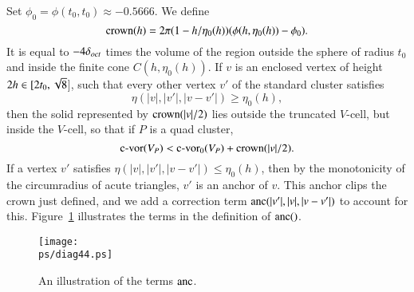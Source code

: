 Set $\phi_0=\phi(t_0,t_0)\approx -0.5666$. We define
    \begin{equation}\operatorname{crown}(h) =
2\pi(1-h/\eta_0(h))(\phi(h,\eta_0(h))-\phi_0). \end{equation} It
is equal to $-4\delta_{oct}$ times the volume of the region outside the
sphere of radius $t_0$ and inside the finite cone
$C(h,\eta_0(h))$.  If $v$ is an enclosed vertex of height
$2h\in[2t_0,\sqrt8$],
 such that every other vertex $v'$ of the
standard cluster satisfies
$$\eta(|v|,|v'|,|v-v'|)\ge \eta_0(h),$$ then the
solid represented by $\operatorname{crown}(|v|/2)$ lies outside the truncated
$V$-cell, but inside the $V$-cell, so that if $P$ is a quad
cluster,
 $${\operatorname{c-vor}}(V_P) < {\operatorname{c-vor}}_0(V_P) + \operatorname{crown}(|v|/2).$$
If a vertex $v'$ satisfies $\eta(|v|,|v'|,|v-v'|)\le\eta_0(h)$,
then by the monotonicity of the circumradius of acute triangles,
$v'$ is an anchor of $v$.  This anchor clips the crown just
defined, and we add a correction term $\operatorname{anc}(|v'|,|v|,|v-v'|)$ to
account for this. Figure~\ref{fig:anchor} illustrates the terms in
the definition of $\operatorname{anc}()$.



\begin{figure}[htb]
  \centering
  \texttt{[image: \\ps/diag44.ps]}
  \caption{An illustration of the terms $\operatorname{anc}$.}
  \label{fig:anchor}
\end{figure}


